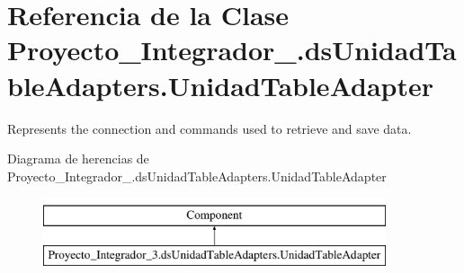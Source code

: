 \hypertarget{class_proyecto___integrador__3_1_1ds_unidad_table_adapters_1_1_unidad_table_adapter}{\section{Referencia de la Clase Proyecto\-\_\-\-Integrador\-\_.\-ds\-Unidad\-Table\-Adapters.\-Unidad\-Table\-Adapter}
\label{class_proyecto___integrador__3_1_1ds_unidad_table_adapters_1_1_unidad_table_adapter}
}


Represents the connection and commands used to retrieve and save data.  


Diagrama de herencias de Proyecto\-\_\-\-Integrador\-\_.\-ds\-Unidad\-Table\-Adapters.\-Unidad\-Table\-Adapter\begin{figure}[H]
\begin{center}
\leavevmode
\includegraphics[height=2.000000cm]{class_proyecto___integrador__3_1_1ds_unidad_table_adapters_1_1_unidad_table_adapter}
\end{center}
\end{figure}

